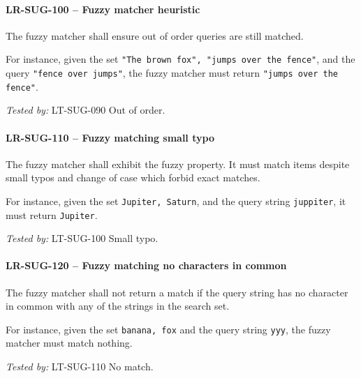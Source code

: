 \paragraph{LR-SUG-100 -- Fuzzy matcher heuristic}
The fuzzy matcher shall ensure out of order queries are still matched.

For instance, given the set \lstinline{"The brown fox", "jumps over the fence"},
and the query \lstinline{"fence over jumps"}, the fuzzy matcher must
return \lstinline{"jumps over the fence"}.

\textit{Tested by: } LT-SUG-090 Out of order.

\paragraph{LR-SUG-110 -- Fuzzy matching small typo}
The fuzzy matcher shall exhibit the fuzzy property. It must match
items despite small typos and change of case
which forbid exact matches.

For instance, given the set \lstinline{Jupiter, Saturn}, and the
query string \lstinline{juppiter}, it must return \lstinline{Jupiter}.

\textit{Tested by: } LT-SUG-100 Small typo.

\paragraph{LR-SUG-120 -- Fuzzy matching no characters in common}
The fuzzy matcher shall not return a match if the query string
has no character in common with any of the strings in the search
set.

For instance, given the set \lstinline{banana, fox} and the query
string \lstinline{yyy}, the fuzzy matcher must match nothing.

\textit{Tested by: } LT-SUG-110 No match.
